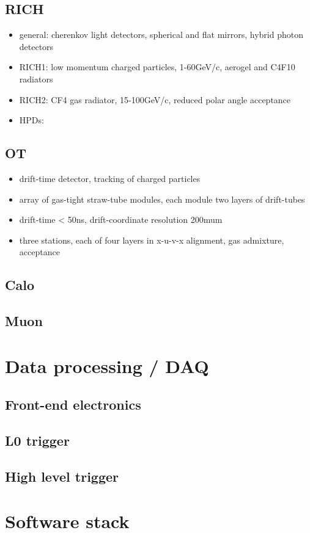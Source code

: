 \subsection{RICH}
\begin{itemize}
  \item general: cherenkov light detectors, spherical and flat mirrors, hybrid photon detectors
  \item RICH1: low momentum charged particles, 1-60GeV/c, aerogel and C4F10 radiators
  \item RICH2: CF4 gas radiator, 15-100GeV/c, reduced polar angle acceptance
  \item HPDs: 
\end{itemize}
\subsection{OT}
\begin{itemize}
  \item drift-time detector, tracking of charged particles
  \item array of gas-tight straw-tube modules, each module two layers of drift-tubes
  \item drift-time < 50ns, drift-coordinate resolution 200mum
  \item three stations, each of four layers in x-u-v-x alignment, gas admixture, acceptance
\end{itemize}
\subsection{Calo}
\subsection{Muon}
\section{Data processing / DAQ}
\subsection{Front-end electronics}
\subsection{L0 trigger}
\subsection{High level trigger}
\section{Software stack}
